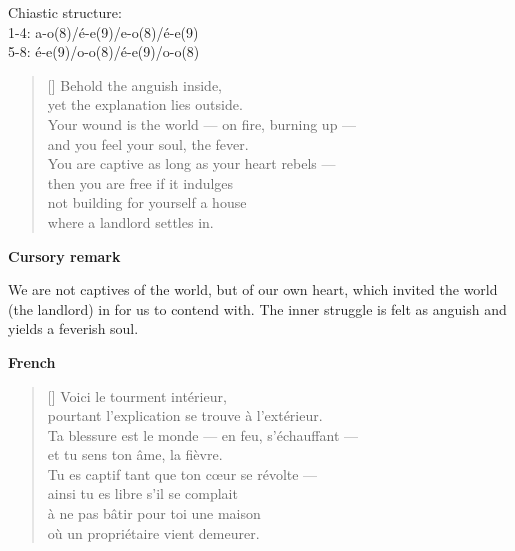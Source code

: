 \documentclass[a4paper,12pt,twoside,final]{book}
\begin{document}
\noindent Chiastic structure: \\
1-4: a-o(8)/é-e(9)/e-o(8)/é-e(9) \\
5-8: é-e(9)/o-o(8)/é-e(9)/o-o(8)

\newpage



\settowidth{\versewidth}{Your wound is the world --- on fire, burning up ---}

\begin{verse}[\versewidth]
  Behold the anguish inside, \\
  yet the explanation lies outside. \\
  Your wound is the world --- on fire, burning up --- \\
  and you feel your soul, the fever. \\
  You are captive as long as your heart rebels --- \\
  then you are free if it indulges \\
  not building for yourself a house \\
  where a landlord settles in. \\
\end{verse}

\bigskip

\noindent \textbf{Cursory remark}

\medskip

We are not captives of the world, but of our own heart, which invited
the world (the landlord) in for us to contend with. The inner struggle
is felt as anguish and yields a feverish soul.

\bigskip

\noindent \textbf{French}


\settowidth{\versewidth}{Ta blessure est le monde --- en feu, s'échauffant ---}

\begin{verse}[\versewidth]
  Voici le tourment intérieur, \\
  pourtant l'explication se trouve à l'extérieur. \\
  Ta blessure est le monde --- en feu, s'échauffant --- \\
  et tu sens ton âme, la fièvre. \\
  Tu es captif tant que ton cœur se révolte --- \\
  ainsi tu es libre s'il se complait \\
  à ne pas bâtir pour toi une maison \\
  où un propriétaire vient demeurer. \\
\end{verse}
\end{document}
